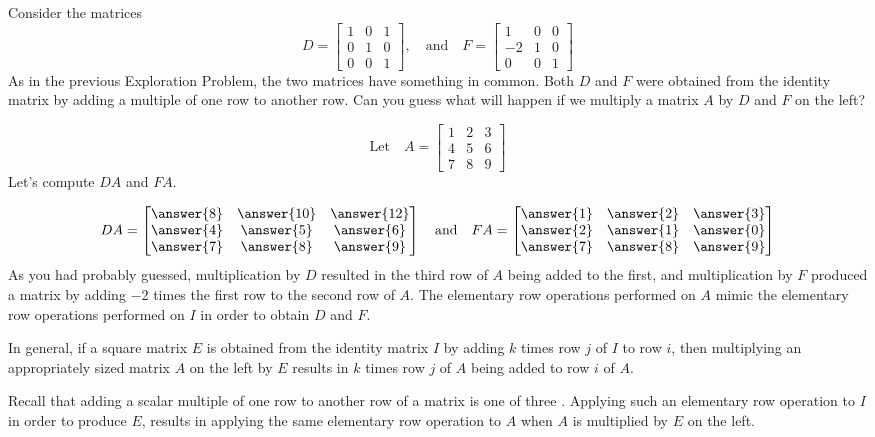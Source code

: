 \documentclass{ximera}
\begin{document}
\begin{exploration}\label{init:elementarymat1}
Consider the matrices
$$
D = \begin{bmatrix}  
 1&0&1\\0&1&0\\0&0&1
 \end{bmatrix},
 \quad \text{and}\quad
F =  \begin{bmatrix}  
 1&0&0\\-2&1&0\\0&0&1
 \end{bmatrix}
$$
As in the previous Exploration Problem, the two matrices have something in common.  Both $D$ and $F$ were obtained from the identity matrix by adding a multiple of one row to another row.  Can you guess what will happen if we multiply a matrix $A$ by $D$ and $F$ on the left?

$$\text{Let}\quad A = \begin{bmatrix}  
 1&2&3\\4&5&6\\7&8&9
 \end{bmatrix}$$
Let's compute $DA$ and $FA$.

$$DA=\begin{bmatrix}\answer{8} & \answer{10} & \answer{12} \\ \answer{4} & \answer{5} & \answer{6}\\ \answer{7} & \answer{8} & \answer{9}\end{bmatrix}
\quad
\text{and}
\quad
FA=\begin{bmatrix}\answer{1} & \answer{2} & \answer{3} \\ \answer{2} & \answer{1} & \answer{0}\\ \answer{7} & \answer{8} & \answer{9}\end{bmatrix}$$
As you had probably guessed, multiplication by $D$ resulted in the third row of $A$ being added to the first, and multiplication by $F$ produced a matrix by adding $-2$ times the first row to the second row of $A$.  The elementary row operations performed on $A$ mimic the elementary row operations performed on $I$ in order to obtain $D$ and $F$.
 \end{exploration}

In general, if a square matrix $E$ is obtained from the identity matrix $I$ by adding $k$ times row $j$ of $I$ to row $i$,  then multiplying an appropriately sized matrix $A$ on the left by $E$ results in $k$ times row $j$ of $A$ being added to row $i$ of $A$.  
 
 Recall that adding a scalar multiple of one row to another row of a matrix is one of three .  Applying such an elementary row operation to $I$ in order to produce $E$, results in applying the same elementary row operation to $A$ when $A$ is multiplied by $E$ on the left.
\end{document}
